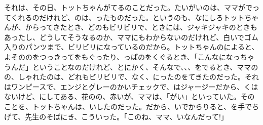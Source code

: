 それは、その日、トットちゃんがてるのことだった。たいがいのは、ママがでってくれるのだけれど、のは、ったものだった。というのも、なにしろトットちゃんが、からってきたとき、どのもビリビリで、ときには、ジャキジャキのときもあったし、どうしてそうなるのか、ママにもわからないのだけれど、白いでゴム入りのパンツまで、ビリビリになっているのだから。トットちゃんのによると、よそののをつっきってをもぐったり、っぱのをくぐるとき、「こんなになっちゃうんだ」ということなのだけれど、とにかく、そんなで、、、をでるとき、ママのの、しゃれたのは、どれもビリビリで、なく、にったのをてきたのだった。それはワンピースで、エンジとグレーのかいチェックで、はジャージーだから、くはないけど、にしてある、花のの、赤いが、ママは、「がい」といっていた。そのことを、トットちゃんは、いしたのだった。だから、いでからりると、を手でちげて、先生のそばにき、こういった。「このね、ママ、いなんだって!」

